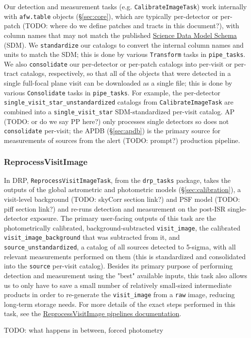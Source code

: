 Our detection and measurement tasks (e.g. \texttt{CalibrateImageTask}) work internally with \texttt{afw.table} objects (\S\ref{sec:core}), which are typically per-detector or per-patch (TODO: where do we define patches and tracts in this document?), with column names that may not match the published \href{https://sdm-schemas.lsst.io}{Science Data Model Schema} (SDM).
We \texttt{standardize} our catalogs to convert the internal column names and units to match the SDM; this is done by various \texttt{Transform} tasks in \texttt{pipe\_tasks}.
We also \texttt{consolidate} our per-detector or per-patch catalogs into per-visit or per-tract catalogs, respectively, so that all of the objects that were detected in a single full-focal plane visit can be downloaded as a single file; this is done by various \texttt{Consolidate} tasks in \texttt{pipe\_tasks}.
For example, the per-detector \texttt{single\_visit\_star\_unstandardized} catalogs from \texttt{CalibrateImageTask} are combined into a \texttt{single\_visit\_star} SDM-standardized per-visit catalog.
AP (TODO: or do we say PP here?) only processes single detectors so does not \texttt{consolidate} per-visit; the APDB (\S\ref{sec:apdb}) is the primary source for measurements of sources from the alert (TODO: prompt?) production pipeline.

\subsubsection{ReprocessVisitImage}
\label{sec:ReprocessVisitImage}

In DRP, \texttt{ReprocessVisitImageTask}, from the \texttt{drp\_tasks} package, takes the outputs of the global astrometric and photometric models (\S\ref{sec:calibration}), a visit-level background (TODO: skyCorr section link?) and PSF model (TODO: piff section link?) and re-runs detection and measurement on the post-ISR single-detector exposure.
The primary user-facing outputs of this task are the photometrically calibrated, background-subtracted \texttt{visit\_image}, the calibrated \texttt{visit\_image\_background} that was subtracted from it, and \texttt{source\_unstandardized}, a catalog of all sources detected to 5-sigma, with all relevant measurements performed on them (this is standardized and consolidated into the \texttt{source} per-visit catalog).
Besides its primary purpose of performing detection and measurement using the "best" available inputs, this task also allows us to only have to save a small number of relatively small-sized intermediate products in order to re-generate the \texttt{visit\_image} from a \texttt{raw} image, reducing long-term storage needs.
For more details of the exact steps performed in this task, see the \href{https://pipelines.lsst.io/v/daily/modules/lsst.drp.tasks/tasks/lsst.drp.tasks.reprocess_visit_image.ReprocessVisitImageTask.html}{ReprocessVisitImage pipelines documentation}.

TODO: what happens in between, forced photometry
